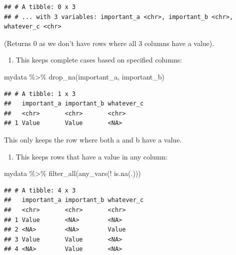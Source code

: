 \documentclass[
]{book}
\newenvironment{Shaded}{\begin{snugshade}}{\end{snugshade}}
\newcommand{\FunctionTok}[1]{\textcolor[rgb]{0.00,0.00,0.00}{#1}}
\newcommand{\NormalTok}[1]{#1}
\newcommand{\SpecialCharTok}[1]{\textcolor[rgb]{0.00,0.00,0.00}{#1}}
\providecommand{\tightlist}{%
  \setlength{\itemsep}{0pt}\setlength{\parskip}{0pt}}
\begin{document}
\begin{verbatim}
## # A tibble: 0 x 3
## # ... with 3 variables: important_a <chr>, important_b <chr>, whatever_c <chr>
\end{verbatim}

(Returns 0 as we don't have rows where all 3 columns have a value).

\begin{enumerate}
\def\labelenumi{(\arabic{enumi})}
\setcounter{enumi}{1}
\tightlist
\item
  This keeps complete cases based on specified columns:
\end{enumerate}

\begin{Shaded}
\begin{Highlighting}[]
\NormalTok{mydata }\SpecialCharTok{\%\textgreater{}\%} 
  \FunctionTok{drop\_na}\NormalTok{(important\_a, important\_b)}
\end{Highlighting}
\end{Shaded}

\begin{verbatim}
## # A tibble: 1 x 3
##   important_a important_b whatever_c
##   <chr>       <chr>       <chr>     
## 1 Value       Value       <NA>
\end{verbatim}

This only keeps the row where both a and b have a value.

\begin{enumerate}
\def\labelenumi{(\arabic{enumi})}
\setcounter{enumi}{2}
\tightlist
\item
  This keeps rows that have a value in any column:
\end{enumerate}

\begin{Shaded}
\begin{Highlighting}[]
\NormalTok{mydata }\SpecialCharTok{\%\textgreater{}\%} 
  \FunctionTok{filter\_all}\NormalTok{(}\FunctionTok{any\_vars}\NormalTok{(}\SpecialCharTok{!} \FunctionTok{is.na}\NormalTok{(.)))}
\end{Highlighting}
\end{Shaded}

\begin{verbatim}
## # A tibble: 4 x 3
##   important_a important_b whatever_c
##   <chr>       <chr>       <chr>     
## 1 Value       <NA>        <NA>      
## 2 <NA>        <NA>        Value     
## 3 Value       Value       <NA>      
## 4 <NA>        Value       <NA>
\end{verbatim}
\end{document}
